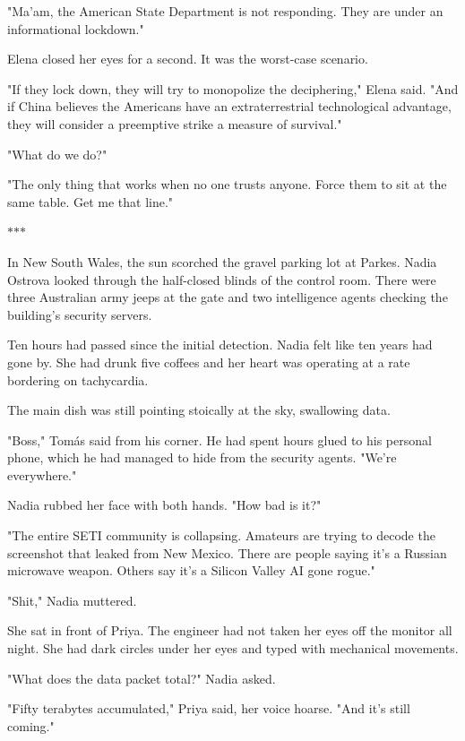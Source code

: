 \documentclass[11pt,a5paper,twoside]{book}
\begin{document}
"Ma'am, the American State Department is not responding. They are under an informational lockdown."

Elena closed her eyes for a second. It was the worst-case scenario.

"If they lock down, they will try to monopolize the deciphering," Elena said. "And if China believes the Americans have an extraterrestrial technological advantage, they will consider a preemptive strike a measure of survival."

"What do we do?"

"The only thing that works when no one trusts anyone. Force them to sit at the same table. Get me that line."

\vspace{1.5em}
\begin{center}$\ast$\quad$\ast$\quad$\ast$\end{center}
\vspace{1.5em}

In New South Wales, the sun scorched the gravel parking lot at Parkes. Nadia Ostrova looked through the half-closed blinds of the control room. There were three Australian army jeeps at the gate and two intelligence agents checking the building's security servers.

Ten hours had passed since the initial detection. Nadia felt like ten years had gone by. She had drunk five coffees and her heart was operating at a rate bordering on tachycardia.

The main dish was still pointing stoically at the sky, swallowing data.

"Boss," Tomás said from his corner. He had spent hours glued to his personal phone, which he had managed to hide from the security agents. "We're everywhere."

Nadia rubbed her face with both hands. "How bad is it?"

"The entire SETI community is collapsing. Amateurs are trying to decode the screenshot that leaked from New Mexico. There are people saying it's a Russian microwave weapon. Others say it's a Silicon Valley AI gone rogue."

"Shit," Nadia muttered.

She sat in front of Priya. The engineer had not taken her eyes off the monitor all night. She had dark circles under her eyes and typed with mechanical movements.

"What does the data packet total?" Nadia asked.

"Fifty terabytes accumulated," Priya said, her voice hoarse. "And it's still coming."
\end{document}
